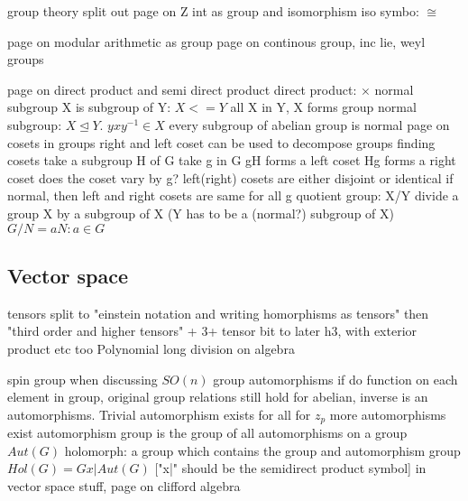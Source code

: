 group theory
	split out
	page on Z int as group and isomorphism
		iso symbo: $\cong$

	page on modular arithmetic as group
	page on continous group, inc lie, weyl groups

	page on direct product and semi direct product
		direct product:
			\(\times\)
	normal subgroup
		X is subgroup of Y: \(X <= Y\)
			all X in Y, X forms group
		normal subgroup: \(X\unlhd Y\).
			\(yxy^{-1} \in X\)
		every subgroup of abelian group is normal
	page on cosets in groups
		right and left coset
		can be used to decompose groups
		finding cosets
			take a subgroup H of G
			take g in G
			gH forms a left coset
			Hg forms a right coset
			does the coset vary by g?
				left(right) cosets are either disjoint or identical
		if normal, then left and right cosets are same for all g
	quotient group:
		X/Y
		divide a group X by a subgroup of X (Y has to be a (normal?) subgroup of X)
		\(G/N = {aN:a\in G}\)
\subsection{Vector space}

tensors split to "einstein notation and writing homorphisms as tensors" then "third order and higher tensors"
+ 3+ tensor bit to later h3, with exterior product etc too
Polynomial long division on algebra

	spin group when discussing \(SO(n)\)
	group automorphisms
		if do function on each element in group, original group relations still hold
		for abelian, inverse is an automorphisms. Trivial automorphism exists for all
		for \(z_p\) more automorphisms exist
		automorphism group is the group of all automorphisms on a group
			\(Aut(G)\)
		holomorph: a group which contains the group and automorphism group
			\(Hol(G)=G x| Aut(G)\) ["x|" should be the semidirect product symbol]
in vector space stuff, page on clifford algebra


